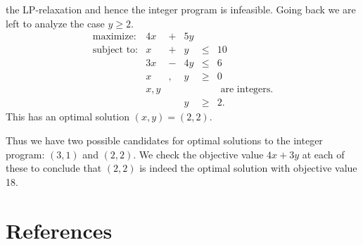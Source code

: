 \documentclass[
]{book}
\theoremstyle{definition}
\theoremstyle{definition}
\theoremstyle{definition}
\theoremstyle{definition}
\theoremstyle{remark}
\begin{document}
the LP-relaxation and hence the integer program is infeasible.
Going back we are left to analyze the case \(y \ge 2\).
\begin{equation*}
\begin{array}{llllll}
  \mbox{maximize:} & 4x & + & 5y \\ 
  \mbox{subject to:} 
  & x & + & y & \le & 10 \\
  & 3x & - & 4y & \le & 6 \\
  & x &, & y & \ge & 0 \\ 
  & x, y & & & & \mbox{ are integers.} \\
  & & & y & \ge & 2.
\end{array}
\end{equation*}
This has an optimal solution \((x, y) = (2, 2)\).

Thus we have two possible candidates for optimal solutions to the integer program: \((3, 1)\) and \((2, 2)\). We check the objective value \(4x + 3y\) at each of these to conclude that \((2, 2)\) is indeed the optimal solution with objective value 18.

\hypertarget{references}{%
\chapter*{References}\label{references}}


  

\nocite{*}
\end{document}
